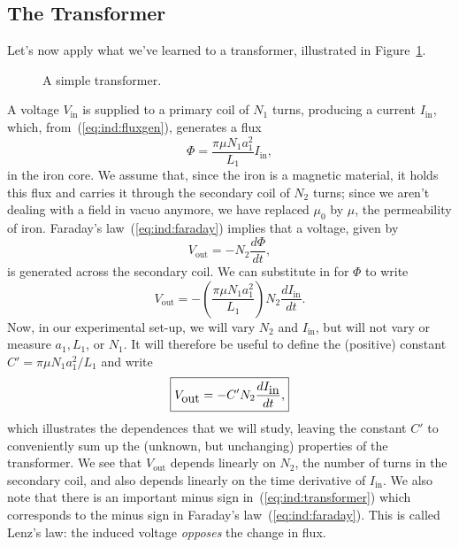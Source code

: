 \subsection{The Transformer}

Let's now apply what we've learned to a transformer, illustrated in 
Figure~\ref{fig:ind:transformer}. 
\begin{figure}[htb]
\centerline{\epsfxsize=10cm }
\caption{A simple transformer.}
\label{fig:ind:transformer}
\end{figure}
A voltage $V_{\mbox{in}}$ is supplied to a primary coil of $N_1$ turns,
producing a current $I_{\mbox{in}}$, which, from~(\ref{eq:ind:fluxgen}),
generates a flux 
$$\Phi= \frac{\pi\mu  N_1 a_1^2}{L_1} I_{\mbox{in}},
$$
in the iron core. We assume that, since the iron is a magnetic material, it
holds this flux and carries it through the secondary coil of $N_2$ turns;
since we aren't dealing with a field in vacuo anymore, we have replaced 
$\mu_0$ by $\mu$, the permeability of iron. 
Faraday's law~(\ref{eq:ind:faraday}) implies that a voltage, given by 
$$V_{\mbox{out}} = - N_2\frac{d\Phi}{dt},$$  
is generated across the secondary coil.  We can substitute in for $\Phi$ to 
write
$$
V_{\mbox{out}} = - \left( \frac{\pi\mu  N_1 a_1^2}{L_1} \right) N_2 
\frac{d I_{\mbox{in}}}{dt}.
$$
Now, in our experimental set-up, we will vary $N_2$ and $I_{\mbox{in}}$, but 
will not vary or measure $a_1,L_1$, or $N_1$. It will therefore be useful to 
define the (positive) constant $C'=\pi\mu  N_1 a_1^2/L_1$ and write
\begin{equation}
\fbox{$ \displaystyle V_{\mbox{out}}= -C' N_2 \frac{d I_{\mbox{in}}}{dt},$} \label{eq:ind:transformer}
\end{equation}
which illustrates the dependences that we will study, leaving the constant
$C'$ to conveniently sum up the (unknown, but unchanging) properties of the 
transformer.  We see that $V_{\mbox{out}}$ depends linearly on $N_2$, the 
number of turns in the secondary coil, and also depends linearly on the
time derivative of $I_{\mbox{in}}$.  We also note that there is an important
minus sign in~(\ref{eq:ind:transformer}) which corresponds to the minus sign
in Faraday's law~(\ref{eq:ind:faraday}). This is called Lenz's law: the induced
voltage {\it opposes} the change in flux.  
  
